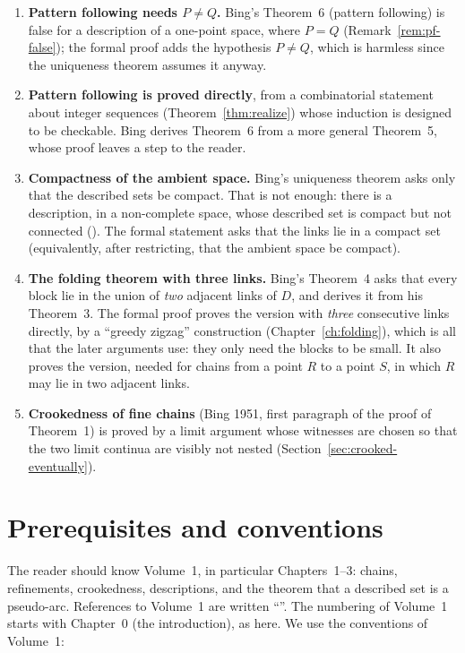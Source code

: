 \begin{enumerate}
\item \textbf{Pattern following needs $P\neq Q$.} Bing's Theorem~6 (pattern following) is false
for a description of a one-point space, where $P=Q$ (Remark~\ref{rem:pf-false}); the formal
proof adds the hypothesis $P\ne Q$, which is harmless since the uniqueness theorem assumes it
anyway.
\item \textbf{Pattern following is proved directly}, from a combinatorial statement about
integer sequences (Theorem~\ref{thm:realize}) whose induction is designed to be checkable. Bing
derives Theorem~6 from a more general Theorem~5, whose proof leaves a step to the reader.
\item \textbf{Compactness of the ambient space.} Bing's uniqueness theorem asks only that the
described sets be compact. That is not enough: there is a description, in a non-complete
space, whose described set is compact but not connected (). The formal
statement asks that the links lie in a compact set (equivalently, after restricting, that the
ambient space be compact).
\item \textbf{The folding theorem with three links.} Bing's Theorem~4 asks that every block lie
in the union of \emph{two} adjacent links of $D$, and derives it from his Theorem~3. The formal
proof proves the version with \emph{three} consecutive links directly, by a ``greedy zigzag''
construction (Chapter~\ref{ch:folding}), which is all that the later arguments use: they only
need the blocks to be small. It also proves the version, needed for chains from a point $R$ to
a point $S$, in which $R$ may lie in two adjacent links.
\item \textbf{Crookedness of fine chains} (Bing 1951, first paragraph of the proof of
Theorem~1) is proved by a limit argument whose witnesses are chosen so that the two limit
continua are visibly not nested (Section~\ref{sec:crooked-eventually}).
\end{enumerate}

\section{Prerequisites and conventions}

The reader should know Volume~1, in particular Chapters~1--3: chains, refinements, crookedness,
descriptions, and the theorem that a described set is a pseudo-arc. References to Volume~1 are
written ``''. The numbering of Volume~1 starts with Chapter~0 (the
introduction), as here. We use the conventions of Volume~1:

